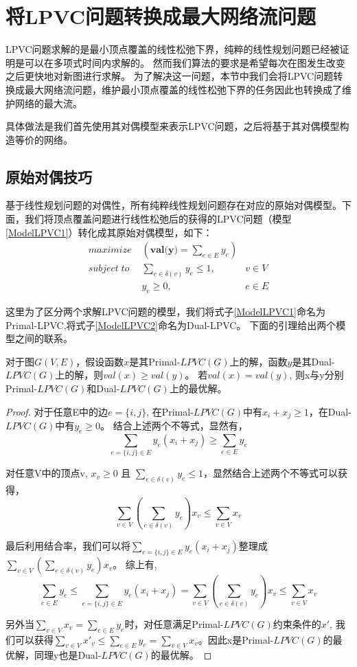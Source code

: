 
\section{将LPVC问题转换成最大网络流问题}

LPVC问题求解的是最小顶点覆盖的线性松弛下界，纯粹的线性规划问题已经被证明是可以在多项式时间内求解的。
然而我们算法的要求是希望每次在图发生改变之后更快地对新图进行求解。
为了解决这一问题，本节中我们会将LPVC问题转换成最大网络流问题，维护最小顶点覆盖的线性松弛下界的任务因此也转换成了维护网络的最大流。

具体做法是我们首先使用其对偶模型来表示LPVC问题，之后将基于其对偶模型构造等价的网络。

\subsection{原始对偶技巧}
基于线性规划问题的对偶性，所有纯粹线性规划问题存在对应的原始对偶模型。下面，我们将顶点覆盖问题进行线性松弛后的获得的LPVC问题（模型\ref{ModelLPVC1}）转化成其原始对偶模型，如下：
\begin{equation} \label{ModelLPVC2} \begin{aligned}
  maximize\; & (\textbf{val(y)} = \sum_{e \in E}{y_e}) &\\
  subject\; to\; & \sum_{e \in \delta(v)}{y_e \le 1}, & v \in V \\
   & y_e \ge 0, & e \in E
\end{aligned} \end{equation}

这里为了区分两个求解LPVC问题的模型，我们将式子\ref{ModelLPVC1}命名为Primal-LPVC,将式子\ref{ModelLPVC2}命名为Dual-LPVC。
下面的引理给出两个模型之间的联系。
\begin{lemma} \label{relationBwtPrimalAndDual}
对于图$G(V, E)$，假设函数$x$是其Primal-$LPVC(G)$上的解，函数$y$是其Dual-$LPVC(G)$上的解，则$val(x) \ge val(y)$。
若$val(x) = val(y)$, 则x与y分别Primal-$LPVC(G)$和Dual-$LPVC(G)$上的最优解。
\end{lemma}
\begin{proof}
  对于任意E中的边$e = \{i, j\}$, 在Primal-$LPVC(G)$中有$x_i + x_j \ge 1$，在Dual-$LPVC(G)$中有$y_e \ge 0$。
  结合上述两个不等式，显然有，\[\sum\limits_{e=\{i, j\} \in E}{y_e(x_i + x_j)} \ge \sum\limits_{e \in E}{y_e}\]

  对任意V中的顶点v, $x_v \ge 0$ 且 $\sum_{e \in \delta(v)}{y_e} \le 1$，显然结合上述两个不等式可以获得，
  \[\sum\limits_{v \in V}{(\sum\limits_{e \in \delta(v)}{y_e})x_v} \le \sum\limits_{v \in V}{x_v}\]

  最后利用结合率，我们可以将$\sum_{e=\{i, j\} \in E}{y_e(x_i + x_j)}$整理成$\sum_{v \in V}{(\sum_{e \in \delta(v)}{y_e})x_v}$。
  综上有,
  \[
    \sum_{e \in E}{y_e} \le \sum_{e=\{i, j\} \in E}{y_e(x_i + x_j)}  = \sum_{v \in V}{(\sum_{e \in \delta(v)}{y_e})x_v} \le \sum_{v \in V}{x_v}
  \]

  另外当$\sum\limits_{v \in V}{x_v} = \sum\limits_{e \in E}{y_e}$时，对任意满足Primal-$LPVC(G)$约束条件的$x'$,
  我们可以获得$\sum\limits_{v \in V}{x'_v} \le \sum\limits_{e \in E}{y_e} = \sum\limits_{v \in V}{x_v}$。因此x是Primal-$LPVC(G)$的最优解，同理y也是Dual-$LPVC(G)$的最优解。
\end{proof}

